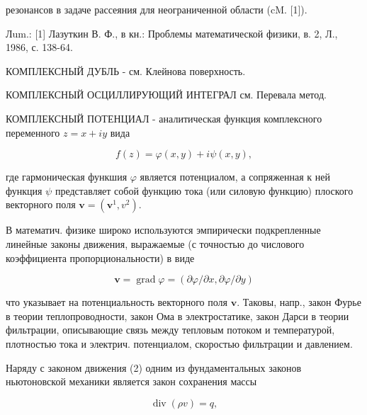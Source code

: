 \documentclass[10pt]{article}
\begin{document}
резонансов в задаче рассеяния для неограниченной области (cM. [1]).



Лum.: [1] Лазуткин В. Ф., в кн.: Проблемы математической физики, в. 2, Л., 1986, с. 138-64.



КОМПЛЕКСНЫЙ ДУБЛЬ - см. Клейнова поверхность.



КОМПЛЕКСНЫЙ ОСЦИЛЛИРУЮЩИЙ ИНТЕГРАЛ см. Перевала метод.



КОМПЛЕКСНЫЙ ПОТЕНЦИАЛ - аналитическая функция комплексного переменного $z=x+i y$ вида



\[

f(z)=\varphi(x, y)+i \psi(x, y),

\]



где гармоническая функшия $\varphi$ является потенциалом, а сопряженная к ней функция $\psi$ представляет собой функцию тока (или силовую функцию) плоского векторного поля $\boldsymbol{v}=\left(\boldsymbol{v}^{1}, v^{2}\right)$.



В математич. физике широко используются эмпирически подкрепленные линейные законы движения, выражаемые (с точностью до числового коэффициента пропорциональности) в виде



\[

\boldsymbol{v}=\operatorname{grad} \varphi=(\partial \varphi / \partial x, \partial \varphi / \partial y)

\]



что указывает на потенциальность векторного поля $\boldsymbol{v}$. Таковы, напр., закон Фурье в теории теплопроводности, закон Ома в электростатике, закон Дарси в теории фильтрации, описывающие связь между тепловым потоком и температурой, плотностью тока и электрич. потенциалом, скоростью фильтрации и давлением.



Наряду с законом движения (2) одним из фундаментальных законов ньютоновской механики является закон сохранения массы



\[

\operatorname{div}(\rho v)=q,

\]
\end{document}
